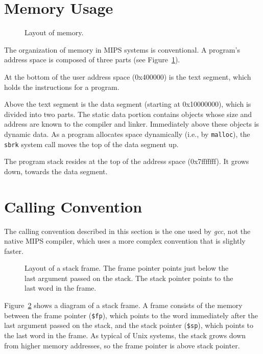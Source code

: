 \section{Memory Usage}

\begin{figure}
  \centerline{}
  \caption{Layout of memory.}
  \label{fig:mem}
\end{figure}
The organization of memory in MIPS systems is conventional.  A
program's address space is composed of three parts (see
Figure~\ref{fig:mem}).

At the bottom of the user address space (0x400000) is the text
segment, which holds the instructions for a program.

Above the text segment is the data segment (starting at 0x10000000),
which is divided into two parts.  The static data portion contains
objects whose size and address are known to the compiler and linker.
Immediately above these objects is dynamic data.  As a program
allocates space dynamically (i.e., by {\tt malloc}), the {\tt sbrk}
system call moves the top of the data segment up.

The program stack resides at the top of the address space
(0x7fffffff).  It grows down, towards the data segment.

\section{Calling Convention}

The calling convention described in this section is the one used by
{\em gcc\/}, not the native MIPS compiler, which uses a more complex
convention that is slightly faster.

\begin{figure}
  \centerline{}
  \caption{Layout of a stack frame.  The frame pointer points just
below the last argument passed on the stack.  The stack pointer points
to the last word in the frame.}
  \label{fig:stack}
\end{figure}
Figure~\ref{fig:stack} shows a diagram of a stack frame.  A frame
consists of the memory between the frame pointer ({\tt \$fp}), which
points to the word immediately after the last argument passed on the
stack, and the stack pointer ({\tt \$sp}), which points to the last
word in the frame.  As typical of Unix systems, the stack grows
down from higher memory addresses, so the frame pointer is above stack
pointer.

